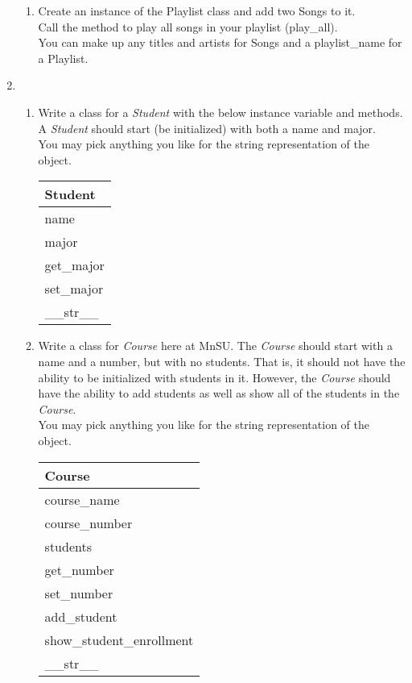 \documentclass{article}
\begin{document}
\begin{enumerate}
\begin{enumerate}
		\item
			Create an instance of the Playlist class and add two Songs to it.\\
			Call the method to play all songs in your playlist (play\_all).\\
			You can make up any titles and artists for Songs and a playlist\_name for a Playlist.\\
	\end{enumerate}
\pagebreak



	\item 
	\begin{enumerate}
		\item 
			Write a class for a \textit{Student} with the below instance variable and methods.\\
			A \textit{Student} should start (be initialized) with both a name and major.\\
			You may pick anything you like for the string representation of the object.
			\begin{flushright}
			\begin{tabular}{|l|} \hline
				Student\\ \hline
				name\\ major\\ \hline
				get\_major\\ set\_major\\ \_\_str\_\_ \\ \hline
			\end{tabular}
			\end{flushright}
		
		\item 
			Write a class for \textit{Course} here at MnSU.  The \textit{Course} should start 
			with a name and a number, but with no students. That is, it should 
			not have the ability to be initialized with students in it. However, the 
			\textit{Course} should have the ability to add students as well as show all of the
			students in the \textit{Course}.\\
			You may pick anything you like for the string representation of the object.
			\begin{flushright}
			\begin{tabular}{|l|} \hline 
				Course\\ \hline
				course\_name\\ course\_number\\ students\\ \hline
				get\_number\\ set\_number\\ add\_student\\ show\_student\_enrollment\\ 
					\_\_str\_\_ \\ \hline
			\end{tabular}
			\end{flushright}


\end{enumerate}
\end{enumerate}
\end{document}
